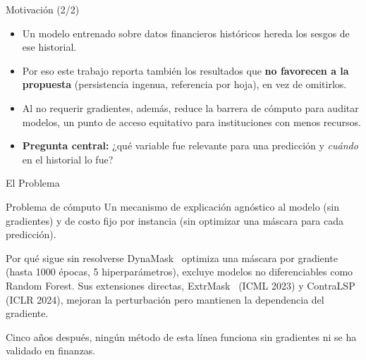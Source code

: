 \documentclass{beamer}
\begin{document}
\begin{frame}{Motivación (2/2)}
    \small
    \begin{itemize}
        \item Un modelo entrenado sobre datos financieros históricos
        hereda los sesgos de ese historial.
        \vspace{0.2cm}
        \item Por eso este trabajo reporta también los resultados que
        \textbf{no favorecen a la propuesta} (persistencia ingenua,
        referencia por hoja), en vez de omitirlos.
        \vspace{0.2cm}
        \item Al no requerir gradientes, además, reduce la barrera de
        cómputo para auditar modelos, un punto de acceso equitativo
        para instituciones con menos recursos.
        \vspace{0.4cm}
        \item \textbf{Pregunta central:} ¿qué variable fue relevante
        para una predicción y \textit{cuándo} en el historial lo fue?
    \end{itemize}
\end{frame}

\begin{frame}{El Problema}
    \small
    \begin{block}{Problema de cómputo}
        Un mecanismo de explicación agnóstico al modelo (sin
        gradientes) y de costo fijo por instancia (sin optimizar una
        máscara para cada predicción).
    \end{block}
    \vspace{0.15cm}
    \begin{alertblock}{Por qué sigue sin resolverse}
        DynaMask~\cite{crabbe2021} optimiza una máscara por gradiente
        (hasta 1000 épocas, 5 hiperparámetros), excluye modelos no
        diferenciables como Random Forest. Sus extensiones directas,
        ExtrMask~\cite{enguehard2023} (ICML 2023) y
        ContraLSP~\cite{liu2024contralsp} (ICLR 2024), mejoran la
        perturbación pero mantienen la dependencia del gradiente.
    \end{alertblock}
    \vspace{0.15cm}
    \begin{center}
        \footnotesize Cinco años después, ningún método de esta línea
        funciona sin gradientes ni se ha validado en finanzas.
    \end{center}
\end{frame}
\end{document}
